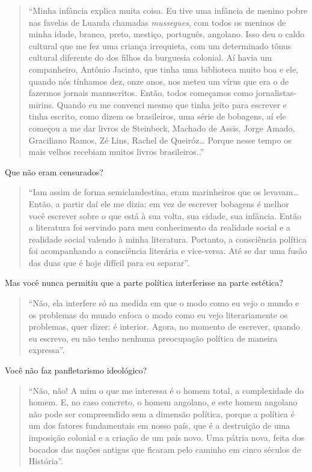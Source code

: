 \documentclass[
  letterpaper,
  DIV=11,
  numbers=noendperiod]{scrreprt}
\begin{document}
\begin{quote}
``Minha infância explica muita coisa. Eu tive uma infância de menino
pobre nas favelas de Luanda chamadas \emph{mussegues}, com todos os
meninos de minha idade, branco, preto, mestiço, português, angolano.
Isso deu o caldo cultural que me fez uma criança irrequieta, com um
determinado tônus cultural diferente do dos filhos da burguesia
colonial. Aí havia um companheiro, Antônio Jacinto, que tinha uma
biblioteca muito boa e ele, quando nós tínhamos dez, onze anos, nos
meteu um vírus que era o de fazermos jornais manuscritos. Então, todos
começamos como jornalistas-mirins. Quando eu me convenci mesmo que tinha
jeito para escrever e tinha escrito, como dizem os brasileiros, uma
série de bobagens, aí ele começou a me dar livros de Steinbeck, Machado
de Assis, Jorge Amado, Graciliano Ramos, Zé Lins, Rachel de
Queiróz\ldots{} Porque nesse tempo os mais velhos recebiam muitos livros
brasileiros..''
\end{quote}

Que não eram censurados?

\begin{quote}
``Iam assim de forma semiclandestina, eram marinheiros que os
levavam\ldots{} Então, a partir daí ele me dizia: em vez de escrever
bobagens é melhor você escrever sobre o que está à sua volta, sua
cidade, sua infância. Então a literatura foi servindo para meu
conhecimento da realidade social e a realidade social valendo à minha
literatura. Portanto, a consciência política foi acompanhando a
consciência literária e vice-versa. Até se dar uma fusão das duas que é
hoje difícil para eu separar''.
\end{quote}

Mas você nunca permitiu que a parte política interferisse na parte
estética?

\begin{quote}
``Não, ela interfere só na medida em que o modo como eu vejo o mundo e
os problemas do mundo enfoca o modo como eu vejo literariamente os
problemas, quer dizer: é interior. Agora, no momento de escrever, quando
eu escrevo, eu não tenho nenhuma preocupação política de maneira
expressa''.
\end{quote}

Você não faz panfletarismo ideológico?

\begin{quote}
``Não, não! A mim o que me interessa é o homem total, a complexidade do
homem. E, no caso concreto, o homem angolano, e este homem angolano não
pode ser compreendido sem a dimensão política, porque a política é um
dos fatores fundamentais em nosso país, que é a destruição de uma
imposição colonial e a criação de um país novo. Uma pátria nova, feita
dos bocados das nações antigas que ficaram pelo caminho em cinco séculos
de História''.
\end{quote}
\end{document}
